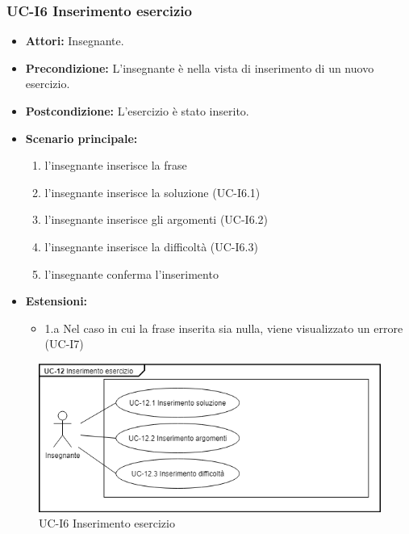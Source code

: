 \subsubsection{UC-I6 Inserimento esercizio}
	\begin{itemize}
		\item \textbf{Attori: }Insegnante.
		\item \textbf{Precondizione: }L'insegnante è nella vista di inserimento di un nuovo esercizio.
		\item \textbf{Postcondizione: }L'esercizio è stato inserito.
		\item \textbf{Scenario principale: }
			\begin{enumerate} 
				\item l'insegnante inserisce la frase
				\item l'insegnante inserisce la soluzione (UC-I6.1)
				\item l'insegnante inserisce gli argomenti (UC-I6.2)
				\item l'insegnante inserisce la difficoltà (UC-I6.3)
				\item l'insegnante conferma l'inserimento
			\end{enumerate}
		\item \textbf{Estensioni:} 
			\begin{itemize}
				\item 1.a Nel caso in cui la frase inserita sia nulla, viene visualizzato un errore (UC-I7)
			\end{itemize}
	\end{itemize}
	\begin{figure}[h]
		\centering
		\includegraphics[scale=0.7]{images/UC-12.png}
		\caption{UC-I6 Inserimento esercizio}
	\end{figure}

